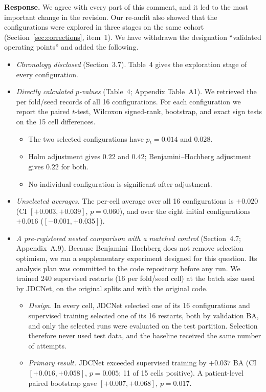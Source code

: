 \documentclass[11pt]{article}
\begin{document}
\textbf{Response.} We agree with every part of this comment, and it led to the
most important change in the revision. Our re-audit also showed that the
configurations were explored in three stages on the same cohort
(Section~\ref{sec:corrections}, item~1). We have withdrawn the designation
``validated operating points'' and added the following.
\begin{itemize}[leftmargin=1.4em]
  \item \emph{Chronology disclosed} (Section~3.7). Table~4 gives the exploration stage of every configuration.
  \item \emph{Directly calculated $p$-values} (Table~4; Appendix Table~A1). We retrieved the per fold/seed records of all 16 configurations. For each configuration we report the paired $t$-test, Wilcoxon signed-rank, bootstrap, and exact sign tests on the 15 cell differences.
  \begin{itemize}[leftmargin=1.2em]
    \item The two selected configurations have $p_t=0.014$ and $0.028$.
    \item Holm adjustment gives $0.22$ and $0.42$; Benjamini--Hochberg adjustment gives $0.22$ for both.
    \item No individual configuration is significant after adjustment.
  \end{itemize}
  \item \emph{Unselected averages.} The per-cell average over all 16 configurations is $+0.020$ (CI $[+0.003,+0.039]$, $p=0.060$), and over the eight initial configurations $+0.016$ ($[-0.001,+0.035]$).
  \item \emph{A pre-registered nested comparison with a matched control} (Section~4.7; Appendix~A.9). Because Benjamini--Hochberg does not remove selection optimism, we ran a supplementary experiment designed for this question. Its analysis plan was committed to the code repository before any run. We trained 240 supervised restarts (16 per fold/seed cell) at the batch size used by JDCNet, on the original splits and with the original code.
  \begin{itemize}[leftmargin=1.2em]
    \item \emph{Design.} In every cell, JDCNet selected one of its 16 configurations and supervised training selected one of its 16 restarts, both by validation BA, and only the selected runs were evaluated on the test partition. Selection therefore never used test data, and the baseline received the same number of attempts.
    \item \emph{Primary result.} JDCNet exceeded supervised training by $+0.037$ BA (CI $[+0.016,+0.058]$, $p=0.005$; 11 of 15 cells positive). A patient-level paired bootstrap gave $[+0.007,+0.068]$, $p=0.017$.

\end{itemize}
\end{itemize}
\end{document}
